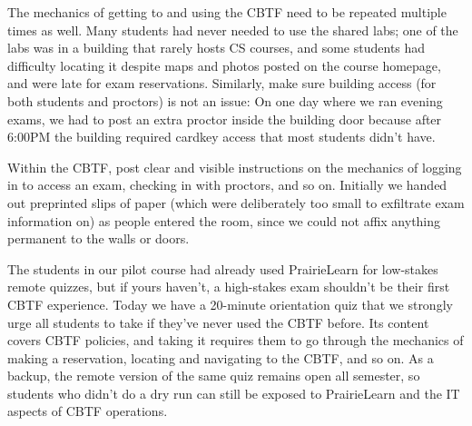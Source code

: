 The mechanics of getting to and using the CBTF need to be repeated
multiple times as well.
Many students had never needed to use
the shared labs; one of the labs was in a building that rarely hosts CS
courses, and some students had difficulty locating it 
despite maps and photos posted on the course homepage, and 
were late for exam reservations. 
Similarly, make sure building access (for both students and proctors)
is not an issue:
On one day where we ran evening exams,  we had to post
an extra proctor inside the building door because after 6:00PM the building required cardkey
access that most students didn't have.

Within the CBTF, post clear and visible instructions on the mechanics of logging
in to access an exam, checking in with proctors, and so on.
Initially we handed out preprinted slips of paper
(which were deliberately too small to exfiltrate exam information on)
as people
entered the room, since we could not affix anything permanent to the
walls or doors.

The students in our pilot course had already used PrairieLearn
for low-stakes remote quizzes, but if yours
haven't, a high-stakes exam shouldn't be their first CBTF experience.
Today we have a 20-minute orientation quiz that we strongly
urge all students to take if they've never used the CBTF before. Its
content covers CBTF policies, and taking
it requires them to go through the mechanics of 
making a reservation, locating and navigating to the
CBTF, and so on.  As a backup, the remote version of the same quiz
remains open all semester, so students who didn't do a dry run can
still be exposed to PrairieLearn and the IT aspects of CBTF operations.
